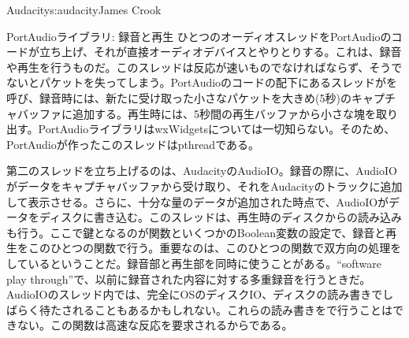 \begin{aosachapter}{Audacity}{s:audacity}{James Crook}
\begin{aosasect1}{PortAudioライブラリ: 録音と再生}
ひとつのオーディオスレッドをPortAudioのコードが立ち上げ、それが直接オーディオデバイスとやりとりする。これは、録音や再生を行うものだ。このスレッドは反応が速いものでなければならず、そうでないとパケットを失ってしまう。PortAudioのコードの配下にあるスレッドがを呼び、録音時には、新たに受け取った小さなパケットを大きめ(5秒)のキャプチャバッファに追加する。再生時には、5秒間の再生バッファから小さな塊を取り出す。PortAudioライブラリはwxWidgetsについては一切知らない。そのため、PortAudioが作ったこのスレッドはpthreadである。

第二のスレッドを立ち上げるのは、AudacityのAudioIO。録音の際に、AudioIOがデータをキャプチャバッファから受け取り、それをAudacityのトラックに追加して表示させる。さらに、十分な量のデータが追加された時点で、AudioIOがデータをディスクに書き込む。このスレッドは、再生時のディスクからの読み込みも行う。ここで鍵となるのが関数といくつかのBoolean変数の設定で、録音と再生をこのひとつの関数で行う。重要なのは、このひとつの関数で双方向の処理をしているということだ。録音部と再生部を同時に使うことがある。``software play through''で、以前に録音された内容に対する多重録音を行うときだ。AudioIOのスレッド内では、完全にOSのディスクIO、ディスクの読み書きでしばらく待たされることもあるかもしれない。これらの読み書きをで行うことはできない。この関数は高速な反応を要求されるからである。


\end{aosasect1}
\end{aosachapter}
